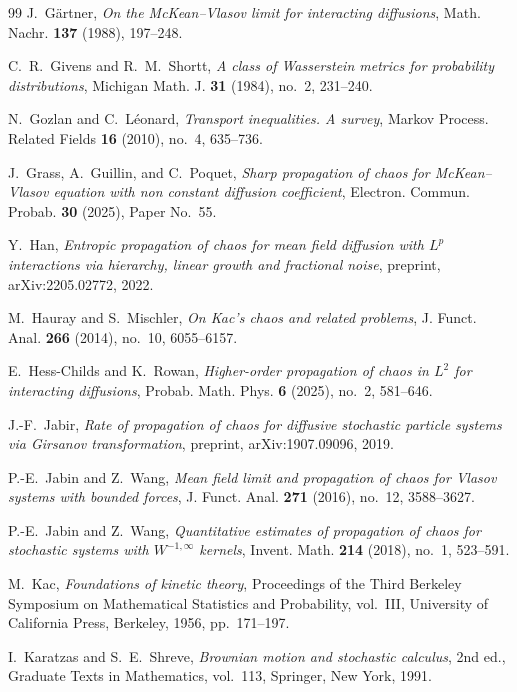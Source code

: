 \documentclass[11pt]{amsart}
\numberwithin{equation}{section}
\theoremstyle{plain}
\theoremstyle{remark}
\begin{document}
\begin{thebibliography}{99}
J.~G\"artner, \emph{On the McKean--Vlasov limit for interacting diffusions}, Math. Nachr. \textbf{137} (1988), 197--248.

C.~R.~Givens and R.~M.~Shortt, \emph{A class of Wasserstein metrics for probability distributions}, Michigan Math. J. \textbf{31} (1984), no.~2, 231--240.

N.~Gozlan and C.~L\'eonard, \emph{Transport inequalities. A survey}, Markov Process. Related Fields \textbf{16} (2010), no.~4, 635--736.

J.~Grass, A.~Guillin, and C.~Poquet, \emph{Sharp propagation of chaos for McKean--Vlasov equation with non constant diffusion coefficient}, Electron. Commun. Probab. \textbf{30} (2025), Paper No.~55.

Y.~Han, \emph{Entropic propagation of chaos for mean field diffusion with $L^p$ interactions via hierarchy, linear growth and fractional noise}, preprint, arXiv:2205.02772, 2022.

M.~Hauray and S.~Mischler, \emph{On Kac's chaos and related problems}, J. Funct. Anal. \textbf{266} (2014), no.~10, 6055--6157.

E.~Hess-Childs and K.~Rowan, \emph{Higher-order propagation of chaos in $L^2$ for interacting diffusions}, Probab. Math. Phys. \textbf{6} (2025), no.~2, 581--646.

J.-F.~Jabir, \emph{Rate of propagation of chaos for diffusive stochastic particle systems via Girsanov transformation}, preprint, arXiv:1907.09096, 2019.

P.-E.~Jabin and Z.~Wang, \emph{Mean field limit and propagation of chaos for Vlasov systems with bounded forces}, J. Funct. Anal. \textbf{271} (2016), no.~12, 3588--3627.

P.-E.~Jabin and Z.~Wang, \emph{Quantitative estimates of propagation of chaos for stochastic systems with $W^{-1,\infty}$ kernels}, Invent. Math. \textbf{214} (2018), no.~1, 523--591.

M.~Kac, \emph{Foundations of kinetic theory}, Proceedings of the Third Berkeley Symposium on Mathematical Statistics and Probability, vol.~III, University of California Press, Berkeley, 1956, pp.~171--197.

I.~Karatzas and S.~E.~Shreve, \emph{Brownian motion and stochastic calculus}, 2nd ed., Graduate Texts in Mathematics, vol.~113, Springer, New York, 1991.


\end{thebibliography}
\end{document}
